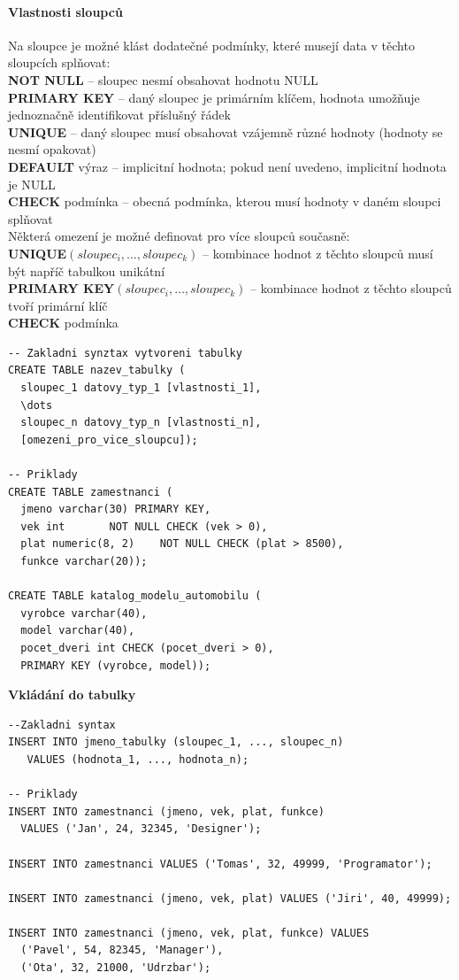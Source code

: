 \documentclass[10pt,a4paper]{article}
\begin{document}
\paragraph{Vlastnosti sloupců}
Na sloupce je možné klást dodatečné podmínky, které musejí data v těchto sloupcích splňovat:
\\\textbf{NOT NULL} – sloupec nesmí obsahovat hodnotu NULL\\
\textbf{PRIMARY KEY} – daný sloupec je primárním klíčem, hodnota umožňuje jednoznačně identifikovat příslušný řádek\\
\textbf{UNIQUE} – daný sloupec musí obsahovat vzájemně různé hodnoty (hodnoty se nesmí opakovat)\\
\textbf{DEFAULT} výraz – implicitní hodnota; pokud není uvedeno, implicitní hodnota je NULL\\
\textbf{CHECK} podmínka – obecná podmínka, kterou musí hodnoty v daném sloupci splňovat\\
Některá omezení je možné definovat pro více sloupců současně:\\
\textbf{UNIQUE}$(sloupec_i, \dots, sloupec_k)$ -- kombinace hodnot z těchto sloupců musí být napříč tabulkou unikátní\\
\textbf{PRIMARY KEY}$(sloupec_i, \dots, sloupec_k)$ -- kombinace hodnot z těchto sloupců tvoří primární klíč\\
\textbf{CHECK} podmínka 

\begin{lstlisting}
-- Zakladni synztax vytvoreni tabulky
CREATE TABLE nazev_tabulky (
  sloupec_1 datovy_typ_1 [vlastnosti_1],
  \dots
  sloupec_n datovy_typ_n [vlastnosti_n],
  [omezeni_pro_vice_sloupcu]);

-- Priklady
CREATE TABLE zamestnanci (
  jmeno varchar(30)	PRIMARY KEY,
  vek int 		NOT NULL CHECK (vek > 0),
  plat numeric(8, 2)	NOT NULL CHECK (plat > 8500),
  funkce varchar(20));

CREATE TABLE katalog_modelu_automobilu (
  vyrobce varchar(40),
  model varchar(40),
  pocet_dveri int CHECK (pocet_dveri > 0),
  PRIMARY KEY (vyrobce, model));
\end{lstlisting}
\newpage
\noindent\textbf{Vkládání do tabulky}
\begin{lstlisting}
--Zakladni syntax
INSERT INTO jmeno_tabulky (sloupec_1, ..., sloupec_n) 
   VALUES (hodnota_1, ..., hodnota_n);

-- Priklady
INSERT INTO zamestnanci (jmeno, vek, plat, funkce) 
  VALUES ('Jan', 24, 32345, 'Designer');

INSERT INTO zamestnanci VALUES ('Tomas', 32, 49999, 'Programator');

INSERT INTO zamestnanci (jmeno, vek, plat) VALUES ('Jiri', 40, 49999);

INSERT INTO zamestnanci (jmeno, vek, plat, funkce) VALUES
  ('Pavel', 54, 82345, 'Manager'),
  ('Ota', 32, 21000, 'Udrzbar');
\end{lstlisting}
\end{document}
